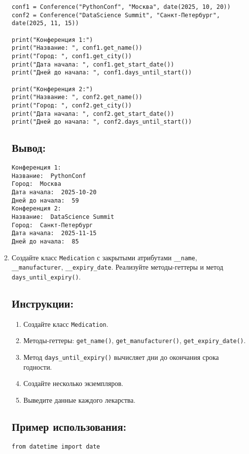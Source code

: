 \begin{enumerate}
\begin{lstlisting}[caption=Пример кода]
conf1 = Conference("PythonConf", "Москва", date(2025, 10, 20))
conf2 = Conference("DataScience Summit", "Санкт-Петербург", date(2025, 11, 15))

print("Конференция 1:")
print("Название: ", conf1.get_name())
print("Город: ", conf1.get_city())
print("Дата начала: ", conf1.get_start_date())
print("Дней до начала: ", conf1.days_until_start())

print("Конференция 2:")
print("Название: ", conf2.get_name())
print("Город: ", conf2.get_city())
print("Дата начала: ", conf2.get_start_date())
print("Дней до начала: ", conf2.days_until_start())
\end{lstlisting}

\subsection*{Вывод:}
\begin{lstlisting}[caption=Ожидаемый вывод]
Конференция 1:
Название:  PythonConf
Город:  Москва
Дата начала:  2025-10-20
Дней до начала:  59
Конференция 2:
Название:  DataScience Summit
Город:  Санкт-Петербург
Дата начала:  2025-11-15
Дней до начала:  85
\end{lstlisting}

\item
Создайте класс \texttt{Medication} с закрытыми атрибутами \texttt{\_\_name}, \texttt{\_\_manufacturer}, \texttt{\_\_expiry\_date}. Реализуйте методы-геттеры и метод \texttt{days\_until\_expiry()}.

\subsection*{Инструкции:}
\begin{enumerate}
    \item Создайте класс \texttt{Medication}.
    \item Методы-геттеры: \texttt{get\_name()}, \texttt{get\_manufacturer()}, \texttt{get\_expiry\_date()}.
    \item Метод \texttt{days\_until\_expiry()} вычисляет дни до окончания срока годности.
    \item Создайте несколько экземпляров.
    \item Выведите данные каждого лекарства.
\end{enumerate}

\subsection*{Пример использования:}
\begin{lstlisting}[caption=Пример кода]
from datetime import date


\end{lstlisting}
\end{enumerate}
